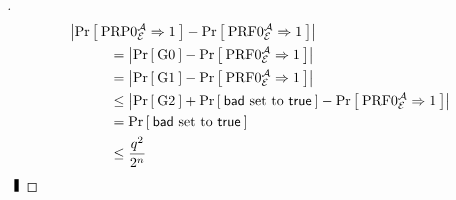 \begin{proof}[]
	 \begin{align*}
	 &\left| \Prob{\PRP0_\cipher^\advA\Rightarrow 1} 
	 - \Prob{\PRF0_\cipher^\advA\Rightarrow1} \right| \\ 
	 &\myInd\myInd\myInd =  \left|\Prob{\G0} - \Prob{\PRF0_\cipher^\advA\Rightarrow1} \right|  \\
	 &\myInd\myInd\myInd  =  \left|\Prob{\G1} - \Prob{\PRF0_\cipher^\advA\Rightarrow1} \right|  \\
	 &\myInd\myInd\myInd  \le \left|\Prob{\G2} + \Prob{\bad \text{ set to } \true} - \Prob{\PRF0_\cipher^\advA\Rightarrow1} \right|\\
	 &\myInd\myInd\myInd  = \Prob{\bad \text{ set to } \true}\\
	 &\myInd\myInd\myInd  \le \frac{q^2}{2^n} \\
	 \end{align*} 
	 $\qedsym$
\end{proof}